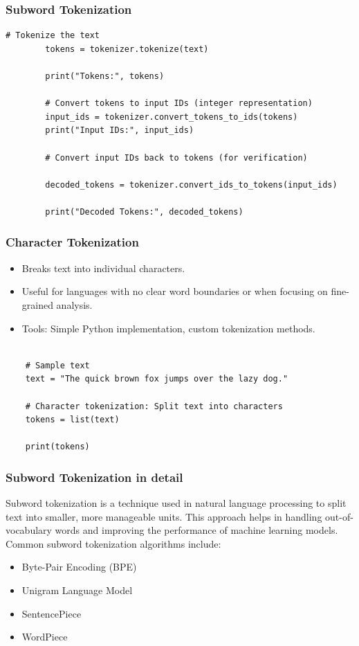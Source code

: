 \documentclass{beamer}
\begin{document}
\begin{frame}[fragile]
    \frametitle{Subword Tokenization}
    \begin{lstlisting}[style=pythonStyle, caption=transformers 02]
        # Tokenize the text
        tokens = tokenizer.tokenize(text)

        print("Tokens:", tokens)

        # Convert tokens to input IDs (integer representation)
        input_ids = tokenizer.convert_tokens_to_ids(tokens)
        print("Input IDs:", input_ids)

        # Convert input IDs back to tokens (for verification)

        decoded_tokens = tokenizer.convert_ids_to_tokens(input_ids)

        print("Decoded Tokens:", decoded_tokens)
    \end{lstlisting}
\end{frame}


\begin{frame}[fragile]
    \frametitle{Character Tokenization}
    \begin{itemize}
        \item Breaks text into individual characters.
        \item Useful for languages with no clear word boundaries or when focusing on fine-grained analysis.
        \item Tools: Simple Python implementation, custom tokenization methods.
    \end{itemize}
    \begin{lstlisting}[style=pythonStyle, caption=Character Tokenization]

    # Sample text
    text = "The quick brown fox jumps over the lazy dog."

    # Character tokenization: Split text into characters
    tokens = list(text)

    print(tokens)
    \end{lstlisting}
\end{frame}

\begin{frame}
\frametitle{Subword Tokenization in detail}
Subword tokenization is a technique used in natural language processing to split text into smaller, more manageable units. This approach helps in handling out-of-vocabulary words and improving the performance of machine learning models. Common subword tokenization algorithms include:
\begin{itemize}
    \item Byte-Pair Encoding (BPE)
    \item Unigram Language Model
    \item SentencePiece
    \item WordPiece
\end{itemize}
\end{frame}
\end{document}
